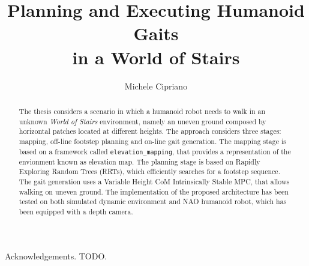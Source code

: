 \documentclass[LaM,binding=0.6cm]{sapthesis}
\title{Planning and Executing Humanoid Gaits \\in a World of Stairs}
\author{Michele Cipriano}
\begin{document}
\frontmatter

\maketitle

\dedication{Dedicated to\\ TODO}

\begin{abstract}
The thesis considers a scenario in which a humanoid robot needs to walk
in an unknown \textit{World of Stairs} environment, namely an uneven ground
composed by horizontal patches located at different heights. The approach
considers three stages: mapping, off-line footstep planning and on-line
gait generation. The mapping stage is based on a framework called
\texttt{elevation\_mapping}, that provides a representation of the 
envionment known as elevation map. The planning stage is based on Rapidly
Exploring Random Trees (RRTs), which efficiently searches for a footstep
sequence. The gait generation uses a Variable Height CoM Intrinsically Stable
MPC, that allows walking on uneven ground. The implementation of the
proposed architecture has been tested on both simulated dynamic environment
and NAO humanoid robot, which has been equipped with a depth camera.
\end{abstract}

\begin{acknowledgments}
Acknowledgements. TODO.
\end{acknowledgments}

\tableofcontents

\mainmatter








\backmatter
\cleardoublepage
{}

\end{document}
